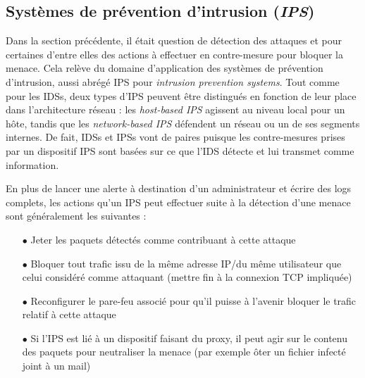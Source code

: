 \documentclass[]{article}
\begin{document}
\subsection{Systèmes de prévention d'intrusion (\textit{IPS})}\label{IPS}
\par Dans la section précédente, il était question de détection des attaques et pour certaines d'entre elles des actions à effectuer en contre-mesure pour bloquer la menace. Cela relève du domaine d'application des systèmes de prévention d'intrusion, aussi abrégé IPS pour \textit{intrusion prevention systems}. Tout comme pour les IDSs, deux types d'IPS peuvent être distingués en fonction de leur place dans l'architecture réseau : les \textit{host-based IPS} agissent au niveau local pour un hôte, tandis que les \textit{network-based IPS} défendent un réseau ou un de ses segments internes. De fait, IDSs et IPSs vont de paires puisque les contre-mesures prises par un dispositif IPS sont basées sur ce que l'IDS détecte et lui transmet comme information.
\vspace{0.2cm}
\par En plus de lancer une alerte à destination d'un administrateur et écrire des logs complets,  les actions qu'un IPS peut effectuer suite à la détection d'une menace sont généralement les suivantes :
\vspace{0.2cm}
\begin{itemize}
\item[$\bullet$] Jeter les paquets détectés comme contribuant à cette attaque
\vspace{0.2cm}
\item[$\bullet$] Bloquer tout trafic issu de la même adresse IP/du même utilisateur que celui considéré comme attaquant (mettre fin à la connexion TCP impliquée)
\vspace{0.2cm}
\item[$\bullet$] Reconfigurer le pare-feu associé pour qu'il puisse à l'avenir bloquer le trafic relatif à cette attaque
\vspace{0.2cm}
\item[$\bullet$] Si l'IPS est lié à un dispositif faisant du proxy, il peut agir sur le contenu des paquets pour neutraliser la menace (par exemple ôter un fichier infecté joint à un mail)
\end{itemize}
\end{document}
